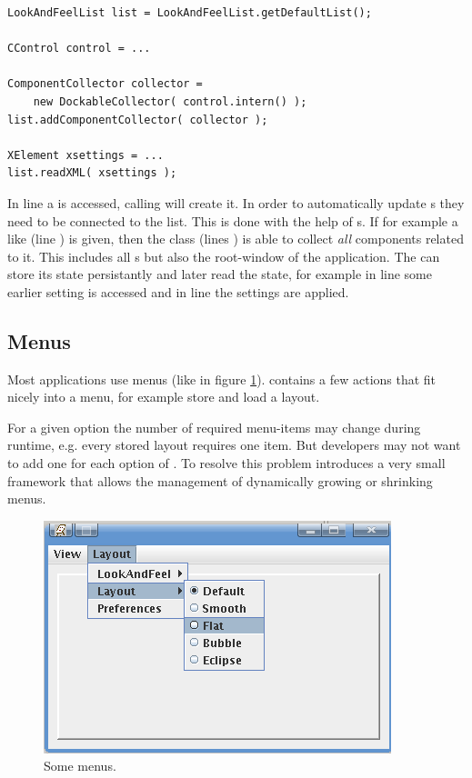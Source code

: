 \begin{lstlisting}
LookAndFeelList list = LookAndFeelList.getDefaultList();

CControl control = ...

ComponentCollector collector = 
	new DockableCollector( control.intern() );
list.addComponentCollector( collector );

XElement xsettings = ...
list.readXML( xsettings );
\end{lstlisting}
In line  a  is accessed, calling  will create it. In order to automatically update s they need to be connected to the list. This is done with the help of s. If for example a  like  (line ) is given, then the class  (lines ) is able to collect \textit{all} components related to it. This includes all s but also the root-window of the application. The  can store its state persistantly and later read the state, for example in line  some earlier setting is accessed and in line  the settings are applied.


\subsection{Menus} \label{sec:menus}
Most  applications use menus (like in figure \ref{fig:menus}).  contains a few actions that fit nicely into a menu, for example store and load a layout.

For a given option the number of required menu-items may change during runtime, e.g. every stored layout requires one item. But developers may not want to add one  for each option of . To resolve this problem  introduces a very small framework that allows the management of dynamically growing or shrinking menus.

\begin{figure}[ht]
\centering
\includegraphics[scale=1]{effects/menus}
\caption{Some menus.}
\label{fig:menus}
\end{figure}

